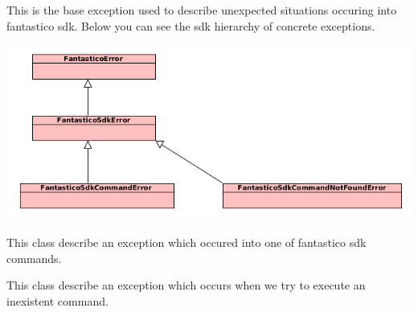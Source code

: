 \documentclass[letterpaper,10pt,english]{sphinxmanual}
\begin{document}

\begin{fulllineitems}
\label{features/sdk:fantastico.sdk.sdk_exceptions.FantasticoSdkError}
This is the base exception used to describe unexpected situations occuring into fantastico sdk. Below you can see the
sdk hierarchy of concrete exceptions.

\includegraphics{exceptions1.png}

\end{fulllineitems}


\begin{fulllineitems}
\label{features/sdk:fantastico.sdk.sdk_exceptions.FantasticoSdkCommandError}
This class describe an exception which occured into one of fantastico sdk commands.

\end{fulllineitems}


\begin{fulllineitems}
\label{features/sdk:fantastico.sdk.sdk_exceptions.FantasticoSdkCommandNotFoundError}
This class describe an exception which occurs when we try to execute an inexistent command.

\end{fulllineitems}
\end{document}
